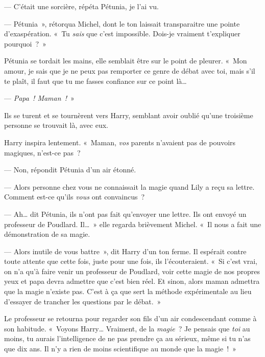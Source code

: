 --- C'était une sorcière, répéta Pétunia, je l'ai vu.

--- Pétunia~», rétorqua Michel, dont le ton laissait transparaitre une pointe d'exaspération. «~Tu \emph{sais} que c'est impossible. Dois-je vraiment t'expliquer pourquoi~?~»

Pétunia se tordait les mains, elle semblait être sur le point de pleurer. «~Mon amour, je sais que je ne peux pas remporter ce genre de débat avec toi, mais s'il te plaît, il faut que tu me fasses confiance sur ce point là…

--- \emph{Papa~! Maman~!}~»

Ils se turent et se tournèrent vers Harry, semblant avoir oublié qu'une troisième personne se trouvait là, avec eux.

Harry inspira lentement. «~Maman, \emph{vos} parents n'avaient pas de pouvoirs magiques, n'est-ce pas~?

--- Non, répondit Pétunia d'un air étonné.

--- Alors personne chez vous ne connaissait la magie quand Lily a reçu sa lettre. Comment est-ce qu'ils \emph{vous} ont convaincus~?

--- Ah… dit Pétunia, ils n'ont pas fait qu'envoyer une lettre. Ils ont envoyé un professeur de Poudlard. Il…~» elle regarda brièvement Michel. «~Il nous a fait une démonstration de sa magie.

--- Alors inutile de vous battre~», dit Harry d'un ton ferme. Il espérait contre toute attente que cette fois, juste pour une fois, ils l'écouteraient. «~Si c'est vrai, on n'a qu'à faire venir un professeur de Poudlard, voir cette magie de nos propres yeux et papa devra admettre que c'est bien réel. Et sinon, alors maman admettra que la magie n'existe pas.  C'est à ça que sert la méthode expérimentale au lieu d'essayer de trancher les questions par le débat.~»

Le professeur se retourna pour regarder son fils d'un air condescendant comme à son habitude. «~Voyons Harry… Vraiment, de la \emph{magie}~? Je pensais que \emph{toi} au moins, tu aurais l'intelligence de ne pas prendre ça au sérieux, même si tu n'as que dix ans. Il n'y a rien de moins scientifique au monde que la magie~!~»

